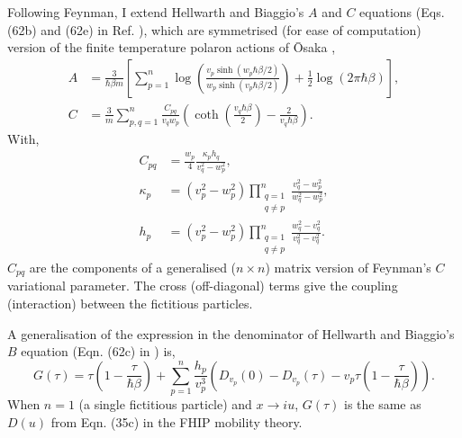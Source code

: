 Following Feynman, I extend Hellwarth and Biaggio's $A$ and $C$ equations (Eqs. (62b) and (62e) in Ref. \cite{Hellwarth1999}), which are symmetrised (for ease of computation) version of the finite temperature polaron actions of \=Osaka \cite{Osaka1959}, 
\begin{subequations}
\begin{align}
    A &= \frac{3}{\hbar \beta m} \left[ \sum_{p = 1}^n \log\left(\frac{v_{p} \sinh (w_{p} \hbar \beta / 2)}{w_{p} \sinh (v_{p} \hbar \beta / 2)}\right) + \frac{1}{2} \log \left(2\pi\hbar \beta\right) \right] , \label{eqn:A} \\
    C &= \frac{3}{m} \sum_{p, q = 1}^n \frac{C_{pq}}{v_{q} w_{p}} \left( \coth \left( \frac{v_{q} \hbar \beta}{2} \right) - \frac{2}{v_{q} \hbar \beta} \right) . \label{eqn:C}
\end{align}
\end{subequations}
With, 
\begin{subequations}
    \begin{align}
        C_{pq} &= \frac{w_{p}}{4} \frac{\kappa_{p} h_{q}}{v_{q}^2 - w_{p}^2} ,\\
        \kappa_{p} &= \left(v_{p}^2 - w_{p}^2 \right) \prod\limits_{\substack{q=1 \\ q\neq p}}^n \frac{v_{q}^2 - w_{p}^2}{w_{q}^2 - w_{p}^2} ,\\
        h_{p} &= \left( v_{p}^2 - w_{p}^2 \right) \prod\limits_{\substack{q=1 \\ q\neq p}}^n \frac{w_{q}^2 - v_{q}^2}{v_{q}^2 - v_{q}^2} .
    \end{align}
\end{subequations}
$C_{pq}$ are the components of a generalised ($n \times n$) matrix version of Feynman's $C$ variational parameter. The cross (off-diagonal) terms give the coupling (interaction) between the fictitious particles.
\newline

A generalisation of the expression in the denominator of Hellwarth and Biaggio's $B$ equation (Eqn. (62c) in \cite{Hellwarth1999}) is,
\begin{equation}\label{eqn:multi_D}
    G(\tau) = \tau  \left(1 - \frac{\tau}{\hbar\beta}\right) + \sum_{p=1}^n \frac{h_p}{v_p^3} \left(D_{v_p}(0) - D_{v_p}(\tau) - v_p \tau \left(1 - \frac{\tau}{\hbar\beta} \right)\right).
\end{equation}
When $n=1$ (a single fictitious particle) and $x \rightarrow iu$, $G(\tau)$ is the same as $D(u)$ from Eqn. (35c) in the FHIP \cite{Feynman1962} mobility theory. 
\newline

